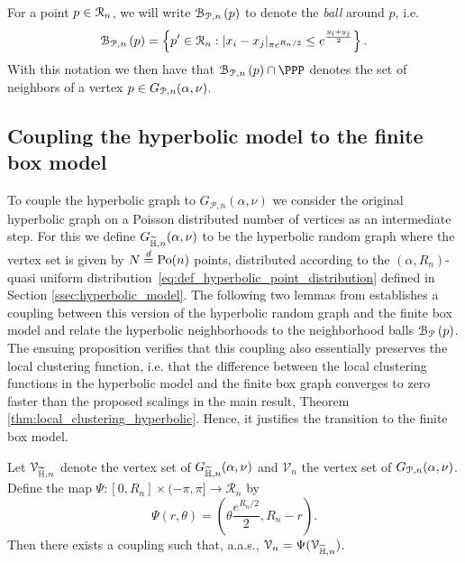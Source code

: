 For a point $p \in {\mathcal R}_n$, we will write ${\mathcal B}_{{\mathcal P},n}\left(p\right)$ to denote the \emph{ball} around $p$, i.e.
\begin{equation}\label{eq:def_ball_P_n}
	{\mathcal B}_{{\mathcal P},n}\left(p\right) = \left\{p^\prime \in {\mathcal R}_n : |x_i - x_j|_{\pi e^{R_n/2}} \leq e^{\frac{y_i + y_j}{2}}\right\}.
\end{equation}
With this notation we then have that $\BallPon{p} \cap \PPP$ denotes the set of neighbors of a vertex $p \in G_{{\mathcal P},n}(\alpha,\nu)$.  


\subsection{Coupling the hyperbolic model to the finite box model}\label{ssec:coupling_H_P}

To couple the hyperbolic graph to $G_{\mathcal{P},n}(\alpha, \nu)$ we consider the original hyperbolic graph on a Poisson distributed number of vertices as an intermediate step. For this we define $G_{\widetilde{\mathbb{H}},n}(\alpha, \nu)$ to be the hyperbolic random graph where the vertex set is given by $N \stackrel{d}{=} {\mathrm{Po}}(n)$ points, distributed according to the $(\alpha, R_n)$-quasi uniform distribution~\eqref{eq:def_hyperbolic_point_distribution} defined in Section \ref{ssec:hyperbolic_model}. The following two lemmas from \cite{fountoulakis2018law} establishes a coupling between this version of the hyperbolic random graph and the finite box model and relate the hyperbolic neighborhoods to the neighborhood balls ${\mathcal B}_{{\mathcal P}}\left(p\right)$. The ensuing proposition verifies that this coupling also essentially preserves the local clustering function, i.e. that the difference between the local clustering functions in the hyperbolic model and the finite box graph converges to zero faster than the proposed scalings in the main result, Theorem \ref{thm:local_clustering_hyperbolic}. Hence, it justifies the transition to the finite box model. 

\begin{lemma}\label{lem:coupling_hyperbolic_poisson}
Let $\mathcal{V}_{\widetilde{\mathbb{H}}, n}$ denote the vertex set of $G_{\widetilde{\mathbb{H}},n}(\alpha, \nu)$ and $\mathcal{V}_n$ the vertex set of $G_{{\mathcal P},n}(\alpha, \nu)$. Define the map $\Psi : [0,R_n] \times (-\pi, \pi] \to \mathcal{R}_n$ by
\begin{equation}\label{eq:def_Psi}
	\Psi(r,\theta) = \left(\theta \frac{e^{R_n/2}}{2}, R_n - r\right).
\end{equation}
Then there exists a coupling such that, a.a.s., $\mathcal{V}_n = \Psi(\mathcal{V}_{\widetilde{\mathbb{H}},n})$. %
\end{lemma}


